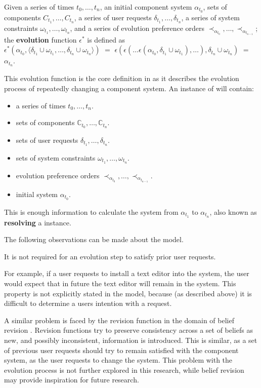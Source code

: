 \begin{defs}
Given a series of times $t_0,\ldots,t_n$, an initial component system $\alpha_{t_0}$, 
sets of components $C_{t_1},\ldots,C_{t_n}$, a series of user requests $\delta_{t_1},\ldots,\delta_{t_n}$, a series of system constraints $\omega_{t_1},\ldots,\omega_{t_n}$,
and a series of evolution preference orders $\prec_{\alpha_{t_0}},\ldots, \prec_{\alpha_{t_{n-1}}}$;
the \textbf{evolution} function $\epsilon^*$ is defined as\\
$\epsilon^*(\alpha_{t_0},\langle \delta_{t_1} \cup \omega_{t_1},\ldots,\delta_{t_n} \cup \omega_{t_n} \rangle)$ $=$ $\epsilon(\epsilon(\ldots \epsilon(\alpha_{t_0},\delta_{t_1} \cup \omega_{t_1}),\ldots),\delta_{t_n} \cup \omega_{t_n})$
$=$ $\alpha_{t_n}$.
\end{defs}

This evolution function is the core definition in \modelname as it describes the evolution process of repeatedly changing a component system.
An instance of \modelname will contain: 
\begin{itemize}
  \item a series of times $t_0,\ldots,t_n$.
  \item sets of components $\mathbb{C}_{t_0},\ldots,\mathbb{C}_{t_n}$.
  \item sets of user requests $\delta_{t_1},\ldots,\delta_{t_n}$.
  \item sets of system constraints $\omega_{t_1},\ldots,\omega_{t_n}$.
  \item evolution preference orders $\prec_{\alpha_{t_0}},\ldots, \prec_{\alpha_{t_{n-1}}}$.
  \item initial system $\alpha_{t_0}$.
\end{itemize}
This is enough information to calculate the system from $\alpha_{t_1}$ to $\alpha_{t_n}$, also known as \textbf{resolving} a \modelname instance.

The following observations can be made about the \modelname model.

\begin{obs}
It is not required for an evolution step to satisfy prior user requests.
\end{obs}
For example, if a user requests to install a text editor into the system, 
the user would expect that in future the text editor will remain in the system.
This property is not explicitly stated in the model, because (as described above) it is difficult to determine a users intention with a request.

A similar problem is faced by the revision function in the domain of belief revision \citep{alchourron1985logic}.
Revision functions try to preserve consistency across a set of beliefs as new, and possibly inconsistent, information is introduced.
This is similar, as a set of previous user requests should try to remain satisfied with the component system, as the user requests to change the system.    
This problem with the evolution process is not further explored in this research, while belief revision may provide inspiration for future research.


